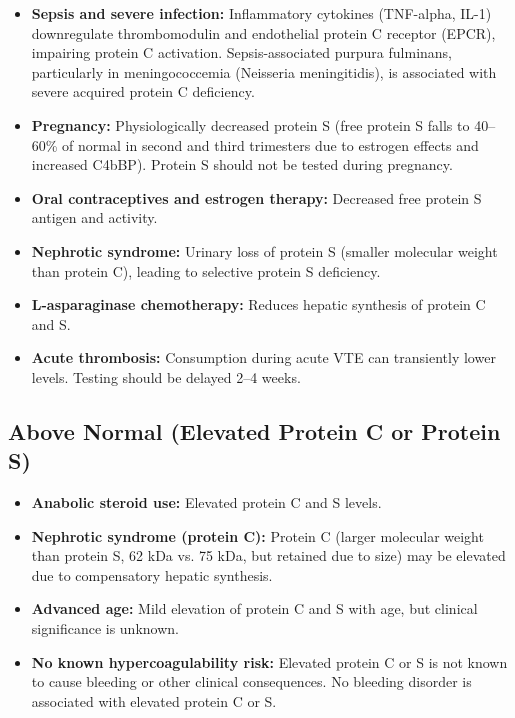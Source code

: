 \begin{itemize}
  \item \textbf{Sepsis and severe infection:} Inflammatory cytokines (TNF-alpha, IL-1) downregulate thrombomodulin and endothelial protein C receptor (EPCR), impairing protein C activation. Sepsis-associated purpura fulminans, particularly in meningococcemia (Neisseria meningitidis), is associated with severe acquired protein C deficiency.
  \item \textbf{Pregnancy:} Physiologically decreased protein S (free protein S falls to 40--60\% of normal in second and third trimesters due to estrogen effects and increased C4bBP). Protein S should not be tested during pregnancy.
  \item \textbf{Oral contraceptives and estrogen therapy:} Decreased free protein S antigen and activity.
  \item \textbf{Nephrotic syndrome:} Urinary loss of protein S (smaller molecular weight than protein C), leading to selective protein S deficiency.
  \item \textbf{L-asparaginase chemotherapy:} Reduces hepatic synthesis of protein C and S.
  \item \textbf{Acute thrombosis:} Consumption during acute VTE can transiently lower levels. Testing should be delayed 2--4 weeks.
\end{itemize}

\subsection*{Above Normal (Elevated Protein C or Protein S)}
\begin{itemize}
  \item \textbf{Anabolic steroid use:} Elevated protein C and S levels.
  \item \textbf{Nephrotic syndrome (protein C):} Protein C (larger molecular weight than protein S, 62 kDa vs. 75 kDa, but retained due to size) may be elevated due to compensatory hepatic synthesis.
  \item \textbf{Advanced age:} Mild elevation of protein C and S with age, but clinical significance is unknown.
  \item \textbf{No known hypercoagulability risk:} Elevated protein C or S is not known to cause bleeding or other clinical consequences. No bleeding disorder is associated with elevated protein C or S.
\end{itemize}

